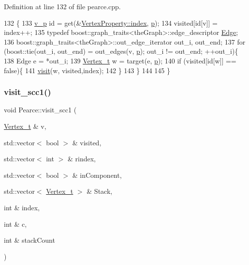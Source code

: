 Definition at line 132 of file pearce.\+cpp.


\begin{DoxyCode}
132                                                                  \{
133     \hyperlink{utilities_8h_a3f4959b3d837fa6351a9414c79280286}{v\_p} \textcolor{keywordtype}{id} = \textcolor{keyword}{get}(&\hyperlink{struct_utility_structs_1_1_vertex_property_a636cb729438e999aa3d9a17ac39d8641}{VertexProperty::index}, \hyperlink{class_pearce_a2320928312fd97f6bcb1f16684f79a03}{p});
134     visited[\textcolor{keywordtype}{id}[v]] = index++;
135     \textcolor{keyword}{typedef} boost::graph\_traits<theGraph>::edge\_descriptor \hyperlink{class_graph_component_aa7517b2af08aa717324076a645c73fe6}{Edge};
136     boost::graph\_traits<theGraph>::out\_edge\_iterator out\_i, out\_end;
137     \textcolor{keywordflow}{for} (boost::tie(out\_i, out\_end) = out\_edges(v, \hyperlink{class_pearce_a2320928312fd97f6bcb1f16684f79a03}{p}); out\_i != out\_end; ++out\_i)\{
138         Edge e = *out\_i;
139         \hyperlink{utilities_8h_a344cd987714d06997f0becda3c96d6e2}{Vertex\_t} w = target(e, \hyperlink{class_pearce_a2320928312fd97f6bcb1f16684f79a03}{p});
140         \textcolor{keywordflow}{if} (visited[\textcolor{keywordtype}{id}[w]] == \textcolor{keyword}{false})\{
141             \hyperlink{class_pearce_ac5e668d0d21ee0dad33cea171b9e2022}{visit}(w, visited,index);
142         \}
143     \}
144 
145 \}
\end{DoxyCode}
\mbox{\label{class_pearce_ae4e9364dd0c829564ecfbfe8ccc07b6a}} 
\subsubsection{\texorpdfstring{visit\+\_\+scc1()}{visit\_scc1()}}
{\footnotesize\ttfamily void Pearce\+::visit\+\_\+scc1 (\begin{DoxyParamCaption}\item[{\hyperlink{class_graph_component_ae67114a6ce5a001dc35e1996e1b45aa0}{Vertex\+\_\+t} \&}]{v,  }\item[{std\+::vector$<$ bool $>$ \&}]{visited,  }\item[{std\+::vector$<$ int $>$ \&}]{rindex,  }\item[{std\+::vector$<$ bool $>$ \&}]{in\+Component,  }\item[{std\+::vector$<$ \hyperlink{class_graph_component_ae67114a6ce5a001dc35e1996e1b45aa0}{Vertex\+\_\+t} $>$ \&}]{Stack,  }\item[{int \&}]{index,  }\item[{int \&}]{c,  }\item[{int \&}]{stack\+Count }\end{DoxyParamCaption})}



